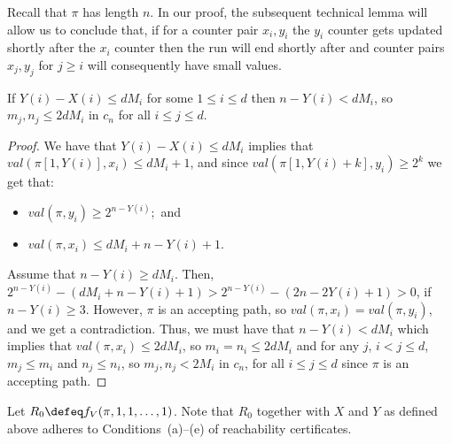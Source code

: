 Recall that $\pi$ has length $n$. In our proof, the subsequent
technical lemma will allow us to conclude that, if for a counter pair
$x_i, y_i$ the $y_i$ counter gets updated shortly after the $x_i$
counter then the run will end shortly after and counter pairs
$x_j,y_j$ for $j\ge i$ will consequently have small values.
%
\begin{lemma}\label{lm:smallpath}
If $Y(i)-X(i)\le dM_i$ for some $1\le i\le d$ then $n-Y(i)< dM_i$, so
$m_j,n_j\le 2dM_i$ in $c_n$ for all $i\le j\le d$.
\end{lemma}
\begin{proof}
We have that $Y(i)-X(i)\le dM_i$ implies that $val(\pi[1,Y(i)],x_i)\le dM_i+1$, and since 
$val(\pi[1,Y(i)+k],y_i)\ge 2^k$ we get that:
\begin{itemize}
\item $val(\pi,y_i)\ge 2^{n-Y(i)};$ and
\item $val(\pi,x_i)\le dM_i+n-Y(i)+1.$
\end{itemize}
Assume that $n-Y(i)\ge dM_i$. Then, $2^{n-Y(i)} - (dM_i+n-Y(i)+1)> 2^{n-Y(i)} - (2n-2Y(i)+1) >0$, if $n-Y(i)\ge 3$. However, $\pi$ is an accepting path, so $val(\pi,x_i)=val(\pi,y_i)$, and we get a contradiction. Thus, we must have that $n-Y(i)< dM_i$ which implies that $val(\pi,x_i)\le 2dM_i$, so $m_i=n_i\le 2dM_i$ and for any 
$j$, $i< j\le d$, $m_j\le m_i$ and $n_j\le n_i$, so $m_j,n_j< 2M_i$ 
in $c_n$, for all $i\le j\le d$ since $\pi$ is an accepting path.
\end{proof}

Let $R_0 \defeq f_V(\pi,1,1,\ldots,1)$. Note that $R_0$ together with
$X$ and $Y$ as defined above adheres to Conditions~(a)--(e) of
reachability certificates.

